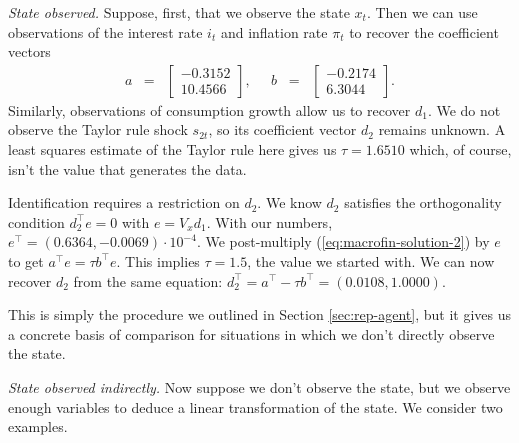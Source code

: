 \documentclass[12pt]{article}
\begin{document}
{{\it State observed.\/}
Suppose, first, that we observe the state $x_t$.
Then we can use observations of the interest rate $i_t$ and inflation rate $\pi_t$ to
recover the coefficient vectors
\begin{eqnarray*}
    a &=&
    \left[
        \begin{array}{r}
        -0.3152 \\ 10.4566
        \end{array}
    \right] ,
    \;\;\;\;\;
    b \;\;=\;\;
    \left[
        \begin{array}{r}
        -0.2174 \\ 6.3044
        \end{array}
    \right] .
\end{eqnarray*}
Similarly, observations of consumption growth allow us to recover $d_1$.
We do not observe the Taylor rule shock $s_{2t}$,
so its coefficient vector $d_2$ remains unknown.
A least squares estimate of the Taylor rule here gives us $\tau = 1.6510$
which, of course, isn't the value that generates the data.


Identification requires a restriction on $d_2$.
We know $d_2$ satisfies the
orthogonality condition $d_2^\top e = 0$ with $e = V_x d_1$.
With our numbers, $ e^\top = (0.6364, -0.0069 ) \cdot 10^{-4}$.
We post-multiply (\ref{eq:macrofin-solution-2}) by $e$ to get
$ a^\top e = \tau b^\top e $.
This implies $\tau = 1.5$, the value we started with.
We can now recover $d_2$ from the same equation:
$ d_2^\top = a^\top - \tau b^\top = (0.0108, 1.0000)$.

This is simply the procedure we outlined in
Section \ref{sec:rep-agent}, but it gives us a concrete
basis of comparison for situations in which we don't directly
observe the state.

{\it State observed indirectly.\/}
Now suppose we don't observe the state, but we observe enough variables
to deduce a linear transformation of the state.
We consider two examples.

}
\end{document}
